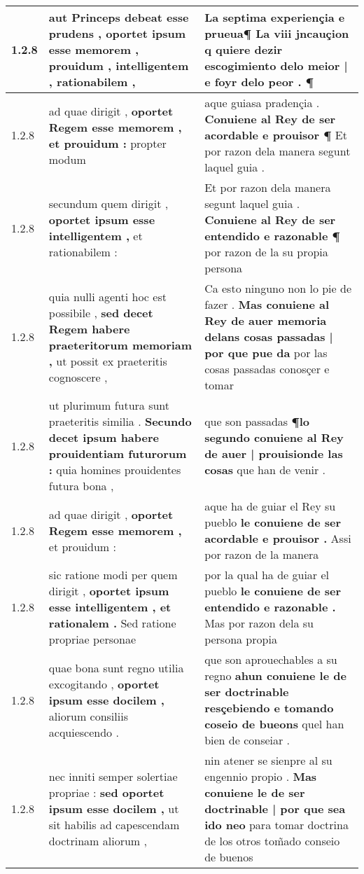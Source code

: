 \begin{tabular}{|p{1cm}|p{6.5cm}|p{6.5cm}|}
1.2.8 & aut Princeps debeat esse prudens , \textbf{ oportet ipsum esse memorem , } prouidum , intelligentem , rationabilem , & La septima experiençia e prueua¶ \textbf{ La viii jncauçion q quiere dezir escogimiento delo meior | e foyr delo peor . } ¶ \\\hline
1.2.8 & ad quae dirigit , \textbf{ oportet Regem esse memorem , et prouidum : } propter modum & aque guiasa pradençia . \textbf{ Conuiene al Rey de ser acordable e prouisor ¶ } Et por razon dela manera segunt laquel guia . \\\hline
1.2.8 & secundum quem dirigit , \textbf{ oportet ipsum esse intelligentem , } et rationabilem : & Et por razon dela manera segunt laquel guia . \textbf{ Conuiene al Rey de ser entendido e razonable ¶ } por razon de la su propia persona \\\hline
1.2.8 & quia nulli agenti hoc est possibile , \textbf{ sed decet Regem habere praeteritorum memoriam , } ut possit ex praeteritis cognoscere , & Ca esto ninguno non lo pie de fazer . \textbf{ Mas conuiene al Rey de auer memoria delans cosas passadas | por que pue da } por las cosas passadas conosçer e tomar \\\hline
1.2.8 & ut plurimum futura sunt praeteritis similia . \textbf{ Secundo decet ipsum habere prouidentiam futurorum : } quia homines prouidentes futura bona , & que son passadas \textbf{ ¶lo segundo conuiene al Rey de auer | prouisionde las cosas } que han de venir . \\\hline
1.2.8 & ad quae dirigit , \textbf{ oportet Regem esse memorem , } et prouidum : & aque ha de guiar el Rey su pueblo \textbf{ le conuiene de ser acordable e prouisor . } Assi por razon de la manera \\\hline
1.2.8 & sic ratione modi per quem dirigit , \textbf{ oportet ipsum esse intelligentem , et rationalem . } Sed ratione propriae personae & por la qual ha de guiar el pueblo \textbf{ le conuiene de ser entendido e razonable . } Mas por razon dela su persona propia \\\hline
1.2.8 & quae bona sunt regno utilia excogitando , \textbf{ oportet ipsum esse docilem , } aliorum consiliis acquiescendo . & que son aprouechables a su regno \textbf{ ahun conuiene le de ser doctrinable resçebiendo e tomando coseio de bueons } quel han bien de conseiar . \\\hline
1.2.8 & nec inniti semper solertiae propriae : \textbf{ sed oportet ipsum esse docilem , } ut sit habilis ad capescendam doctrinam aliorum , & nin atener se sienpre al su engennio propio . \textbf{ Mas conuiene le de ser doctrinable | por que sea ido neo } para tomar doctrina de los otros tom̃ado conseio de buenos \\\hline

\end{tabular}
